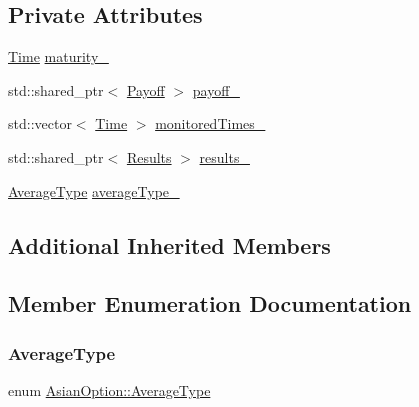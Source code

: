 \subsection*{Private Attributes}
\begin{DoxyCompactItemize}
\item 
\hyperlink{_name_def_8h_ac2d3e0ba793497bcca555c7c2cf64ff3}{Time} \hyperlink{class_asian_option_aff2f0be31b55a1b859cde9ee9b339075}{maturity\+\_\+}
\item 
std\+::shared\+\_\+ptr$<$ \hyperlink{class_payoff}{Payoff} $>$ \hyperlink{class_asian_option_abb0ef9b7f812435dcf24e4dd8edb2be2}{payoff\+\_\+}
\item 
std\+::vector$<$ \hyperlink{_name_def_8h_ac2d3e0ba793497bcca555c7c2cf64ff3}{Time} $>$ \hyperlink{class_asian_option_a8cc25f4cabd8ceac95a69598481f18c8}{monitored\+Times\+\_\+}
\item 
std\+::shared\+\_\+ptr$<$ \hyperlink{class_asian_option_1_1_results}{Results} $>$ \hyperlink{class_asian_option_aea29a8aff78cbe4101b4f060cedb6307}{results\+\_\+}
\item 
\hyperlink{class_asian_option_add7292791bf85820ff9fdbfd4407f3b9}{Average\+Type} \hyperlink{class_asian_option_a602d4f41bc033a8242a0641cf5104045}{average\+Type\+\_\+}
\end{DoxyCompactItemize}
\subsection*{Additional Inherited Members}


\subsection{Member Enumeration Documentation}
\hypertarget{class_asian_option_add7292791bf85820ff9fdbfd4407f3b9}{}\label{class_asian_option_add7292791bf85820ff9fdbfd4407f3b9} 
\subsubsection{\texorpdfstring{Average\+Type}{AverageType}}
{\footnotesize\ttfamily enum \hyperlink{class_asian_option_add7292791bf85820ff9fdbfd4407f3b9}{Asian\+Option\+::\+Average\+Type}}

